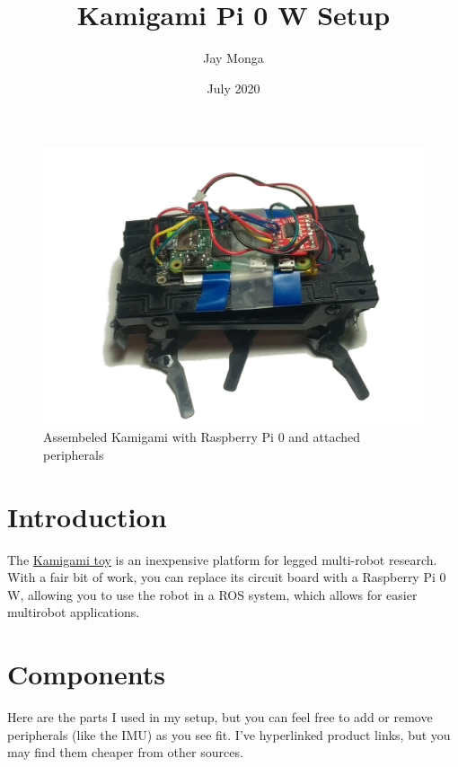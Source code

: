 \documentclass[11pt]{article}
\title{Kamigami Pi 0 W Setup}
\author{Jay Monga}
\date{July 2020}
\begin{document}
\maketitle

\begin{figure}[H]
    \centering
    \includegraphics[width=\textwidth]{images/advert_edit.png}
    \caption{Assembeled Kamigami with Raspberry Pi 0 and attached peripherals}
    \label{fig:kamigami}
\end{figure}

\newpage

\tableofcontents
\newpage

\section{Introduction}
The \href{https://kamigamirobots.com/}{Kamigami toy} is an inexpensive platform for legged multi-robot research. With a fair bit of work, you can replace its circuit board with a Raspberry Pi 0 W, allowing you to use the robot in a ROS system, which allows for easier multirobot applications.

\section{Components} \label{components}

Here are the parts I used in my setup, but you can feel free to add or remove peripherals (like the IMU) as you see fit. I've hyperlinked product links, but you may find them cheaper from other sources.
\end{document}
